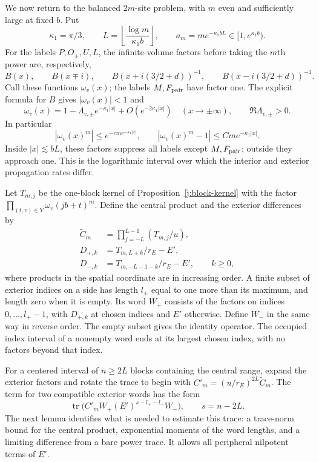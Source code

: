We now return to the balanced $2m$-site problem, with $m$ even and
sufficiently large at fixed $b$. Put
\[
 \kappa_1=\pi/3,\qquad
 L=\left\lfloor\frac{\log m}{\kappa_1b}\right\rfloor,
 \qquad a_m=me^{-\kappa_1bL}\in[1,e^{\kappa_1b}).
\]
For the labels $P,O_\pm,U,L$, the infinite-volume factors before taking
the $m$th power are, respectively,
\[
 B(x),\qquad B(x\mp i),\qquad
 B(x+i(3/2+d))^{-1},\qquad B(x-i(3/2+d))^{-1}.
\]
Call these functions $\omega_v(x)$; the labels $M,F_{\rm pair}$ have
factor one. The explicit formula for $B$ gives $|\omega_v(x)|<1$ and
\begin{equation}\label{j:site-tail}
 \omega_v(x)=1-\Lambda_{v,\pm}e^{-\kappa_1|x|}
                 +O(e^{-2\kappa_1|x|})\quad(x\to\pm\infty),
 \qquad \Re\Lambda_{v,\pm}>0.
\end{equation}
In particular
\[
 |\omega_v(x)^m|\le e^{-cm e^{-\kappa_1|x|}},\qquad
 |\omega_v(x)^m-1|\le Cm e^{-\kappa_1|x|}.
\]
Inside $|x|\lesssim bL$, these factors suppress all labels except
$M,F_{\rm pair}$; outside they approach one. This is the logarithmic
interval over which the interior and exterior propagation rates differ.

Let $T_{m,j}$ be the one-block kernel of Proposition~\ref{j:block-kernel}
with the factor $\prod_{(t,v)\in Y}\omega_v(jb+t)^m$. Define the central
product and the exterior differences by
\begin{equation}\label{j:central-and-defects}
 \begin{split}
 \widetilde C_m&=\prod_{j=-L}^{L-1}(T_{m,j}/u),\\
 D_{+,k}&=T_{m,L+k}/r_E-E',\\
 D_{-,k}&=T_{m,-L-1-k}/r_E-E',\qquad k\ge0,
 \end{split}
\end{equation}
where products in the spatial coordinate are in increasing order. A
finite subset of exterior indices on a side has length $l_\pm$ equal to
one more than its maximum, and length zero when it is empty. Its word
$W_+$ consists of the factors on indices $0,\ldots,l_+-1$, with
$D_{+,k}$ at chosen indices and $E'$ otherwise. Define $W_-$ in the same
way in reverse order. The empty subset gives the identity operator. The
occupied index interval of a nonempty word ends at its largest chosen
index, with no factors beyond that index.

For a centered interval of $n\ge2L$ blocks containing the central range,
expand the exterior factors and rotate the trace to begin with
$C'_m=(u/r_E)^{2L}\widetilde C_m$. The term for two compatible exterior
words has the form
\begin{equation}\label{j:word-trace-form}
 \operatorname{tr}\bigl(C'_m W_+(E')^{s-l_+-l_-}W_-\bigr),
 \qquad s=n-2L.
\end{equation}
The next lemma identifies what is needed to estimate this trace: a
trace-norm bound for the central product, exponential moments of the
word lengths, and a limiting difference from a bare power trace. It
allows all peripheral nilpotent terms of $E'$.

